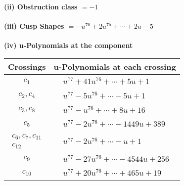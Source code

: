 \documentclass[1p]{elsarticle_modified}
\theoremstyle{definition}
\begin{document}
\flushleft \textbf{(ii) Obstruction class $= -1$}\\~\\
\flushleft \textbf{(iii) Cusp Shapes $= - u^{76}+2 u^{75}+\cdots+2 u-5$}\\~\\
\newpage\renewcommand{\arraystretch}{1}
\flushleft \textbf{(iv) u-Polynomials at the component}\newline \\
\begin{tabular}{m{50pt}|m{274pt}}
Crossings & \hspace{64pt}u-Polynomials at each crossing \\
\hline $$\begin{aligned}c_{1}\end{aligned}$$&$\begin{aligned}
&u^{77}+41 u^{76}+\cdots+5 u+1
\end{aligned}$\\
\hline $$\begin{aligned}c_{2},c_{4}\end{aligned}$$&$\begin{aligned}
&u^{77}-5 u^{76}+\cdots-5 u+1
\end{aligned}$\\
\hline $$\begin{aligned}c_{3},c_{8}\end{aligned}$$&$\begin{aligned}
&u^{77}- u^{76}+\cdots+8 u+16
\end{aligned}$\\
\hline $$\begin{aligned}c_{5}\end{aligned}$$&$\begin{aligned}
&u^{77}-2 u^{76}+\cdots-1449 u+389
\end{aligned}$\\
\hline $$\begin{aligned}c_{6},c_{7},c_{11}\\c_{12}\end{aligned}$$&$\begin{aligned}
&u^{77}-2 u^{76}+\cdots- u+1
\end{aligned}$\\
\hline $$\begin{aligned}c_{9}\end{aligned}$$&$\begin{aligned}
&u^{77}-27 u^{76}+\cdots-4544 u+256
\end{aligned}$\\
\hline $$\begin{aligned}c_{10}\end{aligned}$$&$\begin{aligned}
&u^{77}+20 u^{76}+\cdots+465 u+19
\end{aligned}$\\
\hline
\end{tabular}\\~\\
\end{document}
